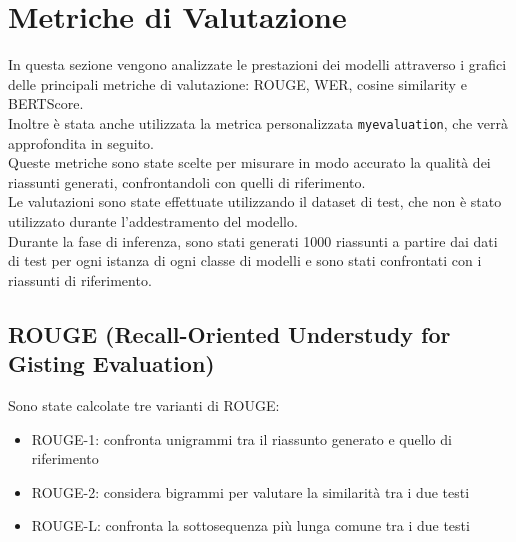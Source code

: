 \section{Metriche di Valutazione}
In questa sezione vengono analizzate le prestazioni dei modelli attraverso i grafici delle principali metriche di valutazione: ROUGE, WER, cosine similarity e BERTScore.\\
Inoltre è stata anche utilizzata la metrica personalizzata \texttt{myevaluation}, che verrà approfondita in seguito.\\ 
Queste metriche sono state scelte per misurare in modo accurato la qualit\`a dei riassunti generati, confrontandoli con quelli di riferimento.\\
Le valutazioni sono state effettuate utilizzando il dataset di test, che non \`e stato utilizzato durante l'addestramento del modello.\\
Durante la fase di inferenza, sono stati generati 1000 riassunti a partire dai dati di test per ogni istanza di ogni classe di modelli e sono stati confrontati con i riassunti di riferimento.\\

\subsection{ROUGE (Recall-Oriented Understudy for Gisting Evaluation)}
Sono state calcolate tre varianti di ROUGE:
\begin{itemize}
    \item ROUGE-1: confronta unigrammi tra il riassunto generato e quello di riferimento
    \item ROUGE-2: considera bigrammi per valutare la similarit\`a tra i due testi
    \item ROUGE-L: confronta la sottosequenza pi\`u lunga comune tra i due testi
\end{itemize}    

